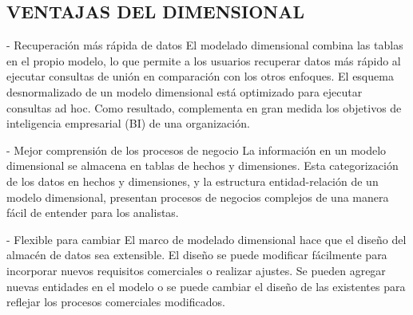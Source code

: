 \documentclass[%
 reprint,
 amsmath,amssymb,
 aps,
]{revtex4-1}
\begin{document}
\subsection{VENTAJAS  DEL DIMENSIONAL}	

- Recuperación más rápida de datos
El modelado dimensional combina las tablas en el propio modelo, lo que permite a los usuarios recuperar datos más rápido al ejecutar consultas de unión en comparación con los otros enfoques. El esquema desnormalizado de un modelo dimensional está optimizado para ejecutar consultas ad hoc. Como resultado, complementa en gran medida los objetivos de inteligencia empresarial (BI) de una organización.

- Mejor comprensión de los procesos de negocio
La información en un modelo dimensional se almacena en tablas de hechos y dimensiones. Esta categorización de los datos en hechos y dimensiones, y la estructura entidad-relación de un modelo dimensional, presentan procesos de negocios complejos de una manera fácil de entender para los analistas.

- Flexible para cambiar
El marco de modelado dimensional hace que el diseño del almacén de datos sea extensible. El diseño se puede modificar fácilmente para incorporar nuevos requisitos comerciales o realizar ajustes. Se pueden agregar nuevas entidades en el modelo o se puede cambiar el diseño de las existentes para reflejar los procesos comerciales modificados.





\end{document}
